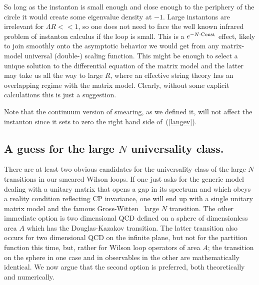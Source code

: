 So long as the instanton is small enough and close enough to the
periphery of the circle it would create some eigenvalue density at
$-1$. Large instantons are irrelevant for $\Lambda R <<1$, so one
does not need to face the well known
infrared problem of instanton calculus if the loop is small. This is
a $e^{-N\cdot {\rm Const}}$ effect, likely to join smoothly
onto the asymptotic behavior we would get from any matrix-model
universal (double-) scaling function. This might be enough to select
a unique solution to the differential equation of the matrix model
and the latter may take us all the way to large $R$, where an
effective string theory has an overlapping regime with the matrix
model. Clearly, without some explicit calculations this is just a
suggestion.

Note that the continuum version of smearing, as we defined it, will
not affect the instanton since it sets to zero the right hand side
of~(\ref{langev}).

\subsection{A guess for the large $N$ universality class.}



There are at least two obvious candidates for the universality
class of the large $N$ transitions in our smeared Wilson loops. If
one just asks for the generic model dealing with a unitary matrix
that opens a gap in its spectrum and which obeys a reality
condition reflecting CP invariance, one will end up with a single
unitary matrix model and the famous Gross-Witten~\cite{gw12} large $N$
transition. The other immediate option is two dimensional QCD
defined on a sphere of dimensionless area $A$ which has the
Douglas-Kazakov transition. The latter transition also occurs for
two dimensional QCD on the infinite plane, but not for the
partition function this time, but, rather for Wilson loop
operators of area $A$; the transition on the sphere in one
case and in observables in the other are mathematically identical.
We now argue that the second option is preferred, both
theoretically and numerically.

